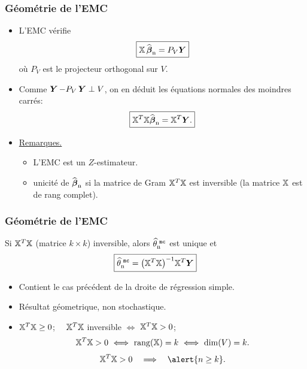  \begin{frame}
\frametitle{Géométrie de l'EMC}
 \begin{itemize}
 \item L'EMC vérifie
$$\boxed{\mathbb{X} \operatorname{\widehat{\boldsymbol{\beta}}_n} = P_V \boldsymbol{Y}}$$
o\`u $P_V$ est le projecteur orthogonal sur $V$.
\item Comme $ \operatorname{\boldsymbol{Y}} - P_V \operatorname{\boldsymbol{Y}} \perp V$, on en déduit \alert{les équations normales des
moindres carrés}:
$$\boxed{\mathbb{X}^T\mathbb{X} {\operatorname{\widehat{\boldsymbol{\beta}}_n}} =
\mathbb{X}^T\boldsymbol{Y}.}$$
\item \underline{Remarques.}
  \begin{itemize}
  \item L'EMC est un $Z$-estimateur.
  \item \alert{unicité} de $\operatorname{\widehat{\boldsymbol{\beta}}_n}$ si la matrice de Gram
  $\mathbb{X}^T\mathbb{X}$ est inversible (la matrice $\mathbb{X}$ est de rang complet).
  \end{itemize}
\end{itemize}
\end{frame}

\begin{frame} \frametitle{Géométrie de l'EMC}
\begin{prop}
Si $\mathbb{X}^T\mathbb{X}$ (matrice $k \times k$) inversible, alors
$\operatorname{\widehat \theta_n^{\,\,{\tt mc}}}$ \alert{est unique} et
$$\boxed{\operatorname{\widehat \theta_n^{\,\,{\tt mc}}} = \big(\mathbb{X}^T\mathbb{X}\big)^{-1}\mathbb{X}^T \boldsymbol{Y}}$$
\end{prop}
\begin{itemize}
\item Contient le cas précédent de la droite de régression simple.
\item Résultat géometrique, \alert{non stochastique}.
\item $\mathbb{X}^T\mathbb{X}\ge0$; \ \ $\mathbb{X}^T\mathbb{X}$
inversible $\Longleftrightarrow$ $\mathbb{X}^T\mathbb{X}>0$;
$$\regressmat^T\regressmat>0 \ \Longleftrightarrow \ {\rm rang}(\regressmat)=k
\ \Longleftrightarrow \ {\rm dim}(V)=k.$$
$$\regressmat^T\regressmat>0 \quad \Longrightarrow \quad \alert{ n \geq k}.$$
\end{itemize}
\end{frame}


